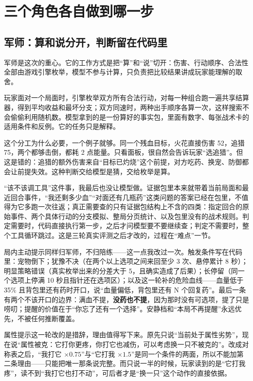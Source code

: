 \section{三个角色各自做到哪一步}

\subsection{军师：算和说分开，判断留在代码里}

军师是这次的重心。它的工作方式是把“算”和“说”切开：伤害、行动顺序、合法性全部由游戏引擎枚举，模型不参与计算，只负责把比较结果讲成玩家能理解的取舍。

玩家面对一个局面时，引擎枚举双方所有合法行动，对每一种组合跑一遍共享结算器，得到平均收益和最坏分支；双方同速时，两种出手顺序各算一次，这样搜索不会偷偷利用随机数。模型拿到的是一份算好的事实包，里面有数字、每张战术卡的适用条件和反例。它的任务只是解释。

这个分工为什么必要，一个例子就够。同一个残血目标，火花直接伤害 52，追猎 75，两个都够击倒，都耗 2 点能量。只看面板，很自然会告诉玩家“选追猎”。但这是错的：追猎的额外伤害来自“目标已灼烧”这个前提，对方吃药、换宠、防御都会让前提失效。这种判断交给模型是猜，交给枚举是算。

“该不该调工具”这件事，我最后也没让模型做。证据包里本来就带着当前局面和最近回合事件，“我还剩多少血”“对面还有几瓶药”这类问题的答案已经在包里，不值得为它多跑一次往返；真正需要查的只有证据包结构上不含的四类：指定回合的原始事件、两个具体行动的分支模拟、整局分页统计、以及包里没有的战术规则。判定需要时，代码直接执行第一步，之后才问模型要不要继续查；判定不需要时，整个工具循环跳过。这是三轮真实评测之后才改的，过程在“难点”一节。

局内主动提示同样归军师，不归陪练——这一点我改过一次。触发条件写在代码里：宠物倒下；犹豫不决（在两个以上选项之间来回至少 3 次、悬停累计 8 秒）；明显策略错误（真实枚举出来的分差大于 5，且确实造成了后果）；长停留（同一个选项上停满 10 秒且指针还在选项区）；以及这一轮补的危险血线——血量低于 35\% 且背包里还有药时开口，说“血量偏低，背包里还有 N 个回复药”。最后一条有两个不该开口的边界：满血不提，\textbf{没药也不提}，因为那时没有可选项，提了只是唠叨；提醒的价值在于“你忘了还有一个选择”。安静档和“本局不再提醒”永远优先，不被任何推断覆盖。

属性提示这一轮改的是措辞，理由值得写下来。原先只说“当前处于属性劣势”，现在说“属性被克：它打你更疼，你打它也减伤，可以考虑换一只不被克的”。改成对称表之后，“我打它 $\times 0.75$”与“它打我 $\times 1.5$”是同一个条件的两面，所以不能加第二条理由——只能把唯一那条说完整。而只说一半的时候，玩家读到的是“它打我疼”，读不到“我打它也打不动”，可后者才是“换一只”这个动作的直接依据。

